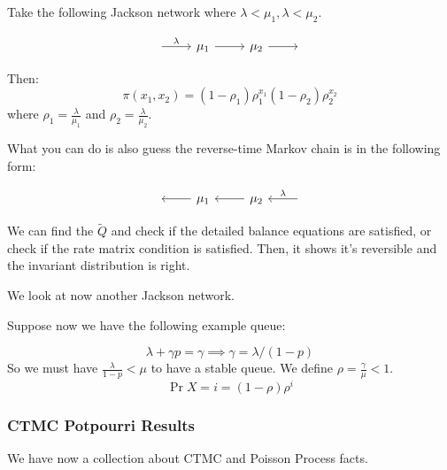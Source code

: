 \begin{example}
    Take the following Jackson network where $\lambda < \mu_1, \lambda < \mu_2$.

    \[\begin{tikzcd}
        {} & \mu_1 & \mu_2 & {}
        \arrow["\lambda", from=1-1, to=1-2]
        \arrow["", from=1-2, to=1-3]
        \arrow["", from=1-3, to=1-4]
    \end{tikzcd}\]

    Then:
    \[ \pi(x_1, x_2) = (1 - \rho_1) \rho_1^{x_1} (1 - \rho_2) \rho_2^{x_2} \]
    where $\rho_1 = \frac{\lambda}{\mu_1}$ and $\rho_2 = \frac{\lambda}{\mu_2}$.

    What you can do is also guess the reverse-time Markov chain is in the following form:

    \[\begin{tikzcd}
        {} & \mu_1 & \mu_2 & {}
        \arrow["", from=1-2, to=1-1]
        \arrow["", from=1-3, to=1-2]
        \arrow["{\lambda}"', from=1-4, to=1-3]
    \end{tikzcd}\]

    We can find the $\tilde{Q}$ and check if the detailed balance equations are satisfied, or check
    if the rate matrix condition is satisfied. Then, it shows it's reversible and the invariant distribution is right.
\end{example}

We look at now another Jackson network.

\begin{example}
    Suppose now we have the following example queue:

    \[ \lambda + \gamma p = \gamma \implies \gamma = \lambda/(1 - p) \]
    So we must have $\frac{\lambda}{1 - p} < \mu$ to have a stable queue. We define $\rho = \frac{\gamma}{\mu} < 1$.
    \[ \Pr{X = i} = ( 1- \rho) \rho^{i} \]
\end{example}

\subsubsection{CTMC Potpourri Results}
We have now a collection about CTMC and Poisson Process facts.

